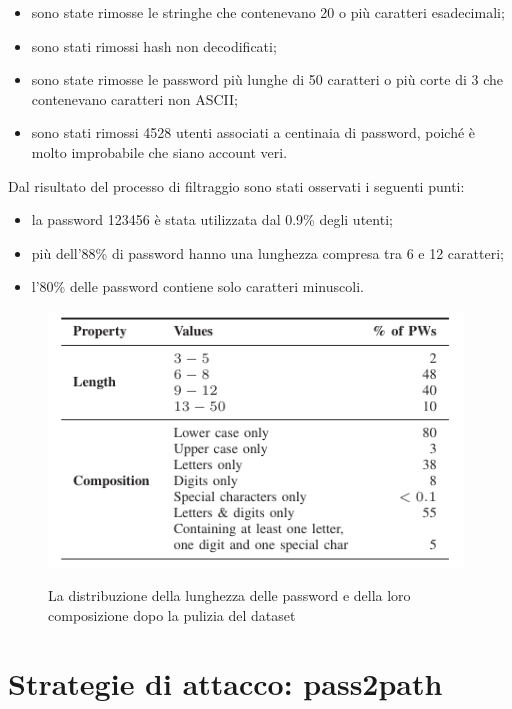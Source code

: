 \begin{itemize}
    \item sono state rimosse le stringhe che contenevano 20 o più caratteri esadecimali;
    \item sono stati rimossi hash non decodificati;
    \item sono state rimosse le password più lunghe di 50 caratteri o più corte di 3 che contenevano caratteri non ASCII;
    \item sono stati rimossi 4528 utenti associati a centinaia di password, poiché è molto improbabile che siano account veri.
\end{itemize}

Dal risultato del processo di filtraggio sono stati osservati i seguenti punti:
\begin{itemize}
    \item la password 123456 è stata utilizzata dal 0.9\% degli utenti;
    \item più dell'88\% di password hanno una lunghezza compresa tra 6 e 12 caratteri;
    \item l'80\% delle password contiene solo caratteri minuscoli.
\end{itemize}

\begin{figure}[h]
    \centering
    \includegraphics[width=11cm]{./immagini/pulizia_dataset_bijeeta.png}
    \label{pulizia dataset}
    \caption{La distribuzione della lunghezza delle password e della loro composizione dopo la pulizia del dataset~\cite{bijeeta}}
\end{figure}



\section{Strategie di attacco: pass2path}
\label{sec:pass2path}
